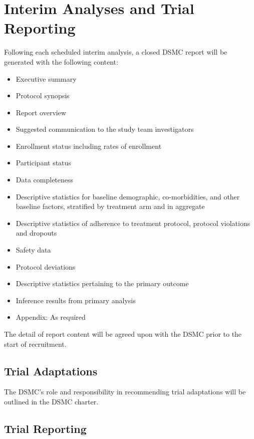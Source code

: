 \documentclass[11pt,parskip=half-]{scrartcl}
\providecommand{\tightlist}{%
  \setlength{\itemsep}{0pt}\setlength{\parskip}{0pt}}
\begin{document}
\clearpage

\section{Interim Analyses and Trial Reporting}\label{interim-analyses-and-trial-reporting}

Following each scheduled interim analysis, a closed DSMC report will be generated with the following content:

\begin{itemize}\tightlist
  \item
        Executive summary
  \item
        Protocol synopsis
  \item
        Report overview
  \item
        Suggested communication to the study team investigators
  \item
        Enrollment status including rates of enrollment
  \item
        Participant status
  \item
        Data completeness
  \item
        Descriptive statistics for baseline demographic, co-morbidities, and other baseline factors, stratified by treatment arm and in aggregate
  \item
        Descriptive statistics of adherence to treatment protocol, protocol violations and dropouts
  \item
        Safety data
  \item
        Protocol deviations
  \item
        Descriptive statistics pertaining to the primary outcome
  \item
        Inference results from primary analysis
  \item
        Appendix: As required
\end{itemize}

The detail of report content will be agreed upon with the DSMC prior to the start of recruitment.

\subsection{Trial Adaptations}\label{trial-adaptations}

The DSMC's role and responsibility in recommending trial adaptations will be outlined in the DSMC charter.

\subsection{Trial Reporting}\label{trial-reporting}
\end{document}

